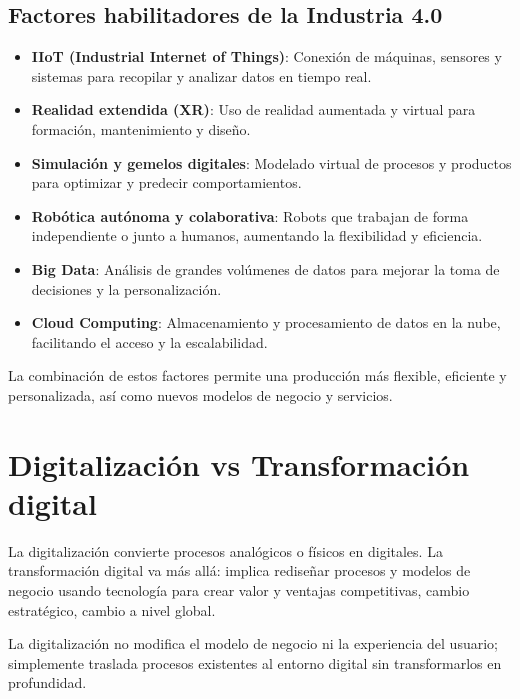\documentclass[11pt,a4paper]{article}
\begin{document}
		\subsection{Factores habilitadores de la Industria 4.0}
		\begin{itemize}
			\item \textbf{IIoT (Industrial Internet of Things)}: Conexión de máquinas, sensores y sistemas para recopilar y analizar datos en tiempo real.
			\item \textbf{Realidad extendida (XR)}: Uso de realidad aumentada y virtual para formación, mantenimiento y diseño.
			\item \textbf{Simulación y gemelos digitales}: Modelado virtual de procesos y productos para optimizar y predecir comportamientos.
			\item \textbf{Robótica autónoma y colaborativa}: Robots que trabajan de forma independiente o junto a humanos, aumentando la flexibilidad y eficiencia.
			\item \textbf{Big Data}: Análisis de grandes volúmenes de datos para mejorar la toma de decisiones y la personalización.
			\item \textbf{Cloud Computing}: Almacenamiento y procesamiento de datos en la nube, facilitando el acceso y la escalabilidad.
		\end{itemize}

		\begin{NotaBox}
		La combinación de estos factores permite una producción más flexible, eficiente y personalizada, así como nuevos modelos de negocio y servicios.
		\end{NotaBox}

		\section{Digitalización vs Transformación digital}

		\begin{ResumenBox}
		La digitalización convierte procesos analógicos o físicos en digitales. La transformación digital va más allá: implica rediseñar procesos y modelos de negocio usando tecnología para crear valor y ventajas competitivas, cambio estratégico, cambio a nivel global.
		\end{ResumenBox}

		\begin{NotaBox}
		La digitalización no modifica el modelo de negocio ni la experiencia del usuario; simplemente traslada procesos existentes al entorno digital sin transformarlos en profundidad.
		\end{NotaBox}
\end{document}
